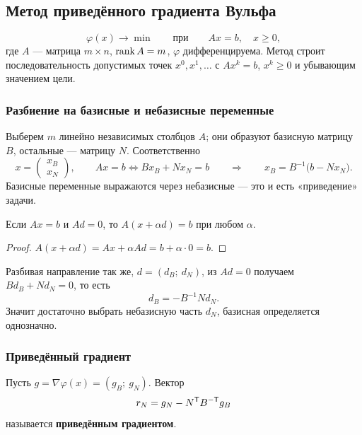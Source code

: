 \subsection{Метод приведённого градиента Вульфа}
\label{subsec:reduced-gradient}

\[
  \varphi(x) \to \min
  \qquad\text{при}\qquad
  A x = b , \quad x \ge 0 ,
\]
где $A$ — матрица $m \times n$, $\operatorname{rank} A = m$, $\varphi$ дифференцируема.
Метод строит последовательность допустимых точек $x^0, x^1, \dots$ с
$Ax^k = b$, $x^k \ge 0$ и убывающим значением цели.

\subsubsection*{Разбиение на базисные и небазисные переменные}

Выберем $m$ линейно независимых столбцов $A$; они образуют базисную матрицу
$B$, остальные — матрицу $N$. Соответственно
\[
  x = \begin{pmatrix} x_B \\ x_N \end{pmatrix} ,
  \qquad
  Ax = b \iff B x_B + N x_N = b
  \qquad\Longrightarrow\qquad
  x_B = B^{-1}\big(b - N x_N\big) .
\]
Базисные переменные выражаются через небазисные — это и есть «приведение»
задачи.

\begin{lemma}\label{lem:wolfe-feasible}
Если $Ax = b$ и $Ad = 0$, то $A(x + \alpha d) = b$ при любом $\alpha$.
\end{lemma}

\begin{proof}
$A(x + \alpha d) = Ax + \alpha A d = b + \alpha\cdot 0 = b$.
\end{proof}

Разбивая направление так же, $d = (d_B;\ d_N)$, из $Ad = 0$ получаем
$B d_B + N d_N = 0$, то есть
\begin{equation}\label{eq:wolfe-dB}
  d_B = -B^{-1} N d_N .
\end{equation}
Значит достаточно выбрать небазисную часть $d_N$, базисная определяется
однозначно.

\subsubsection*{Приведённый градиент}

Пусть $g = \nabla\varphi(x) = (g_B;\ g_N)$. Вектор
\[
  r_N = g_N - N^{\mathsf{T}} B^{-\mathsf{T}} g_B
\]
называется \textbf{приведённым градиентом}.

